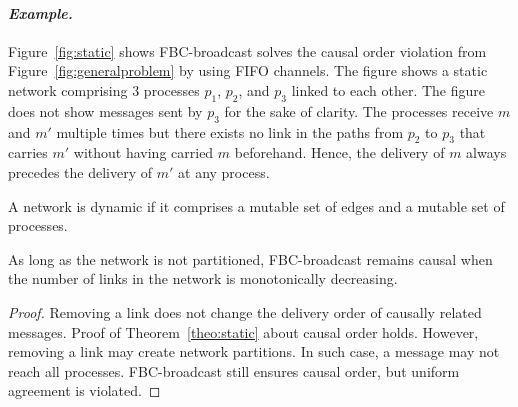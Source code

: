 \paragraph{\emph{Example.}} Figure~\ref{fig:static} shows FBC-broadcast solves
the causal order violation from Figure~\ref{fig:generalproblem} by using FIFO
channels.  The figure shows a static network comprising 3 processes $p_1$,
$p_2$, and $p_3$ linked to each other. The figure does not show messages sent by
$p_3$ for the sake of clarity.  The processes receive $m$ and $m'$ multiple
times but there exists no link in the paths from $p_2$ to $p_3$ that carries $m'$
without having carried $m$ beforehand. Hence, the delivery of $m$ always
precedes the delivery of $m'$ at any process.


\begin{definition}
  A network is dynamic if it comprises a mutable set of edges and a mutable set
  of processes.
\end{definition}

\begin{theorem}
  As long as the network is not partitioned, FBC-broadcast remains causal when
  the number of links in the network is monotonically decreasing.

\end{theorem}

\begin{proof}
  Removing a link does not change the delivery order of causally related
  messages. Proof of Theorem~\ref{theo:static} about causal order holds.
  However, removing a link may create network partitions. In such case, a
  message may not reach all processes. FBC-broadcast still ensures causal order,
  but uniform agreement is violated.
\end{proof}

